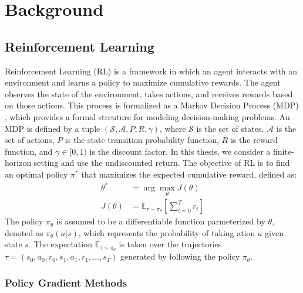 
\chapter{Background}\label{chapter2}

\section{Reinforcement Learning} \label{chap2:sec1}

Reinforcement Learning (RL) is a framework in which an agent interacts with an environment and learns a policy to maximize cumulative rewards.
The agent observes the state of the environment, takes actions, and receives rewards based on those actions.
This process is formalized as a Markov Decision Process (MDP) \cite{MDP}, which provides a formal strcuture for modeling decision-making problems.
An MDP is defined by a tuple \((\mathcal{S}, \mathcal{A}, P, R, \gamma)\), where $\mathcal{S}$ is the set of states, $\mathcal{A}$ is the set of actions, $P$ is the state transition probability function, $R$ is the reward function, and $\gamma \in [0, 1)$ is the discount factor.
In this thesis, we consider a finite-horizon setting and use the undiscounted return.
The objective of RL is to find an optimal policy $\pi^*$ that maximizes the expected cumulative reward, defined as:
\begin{equation}
  \begin{aligned}
    \theta^* &= \arg\max_\theta J(\theta) \\
    J(\theta) &= \mathbb{E}_{\tau \sim \pi_\theta} \left[\sum^T_{t = 0} r_t \right]
  \end{aligned}
\end{equation}
The policy $\pi_\theta$ is assumed to be a differentiable function parmeterized by $\theta$, denoted as $\pi_\theta(a|s)$, which represents the probability of taking ation $a$ given state $s$.
The expectation $\mathbb{E}_{\tau \sim \pi_\theta}$ is taken over the trajectories $\tau = (s_0, a_0, r_0, s_1, a_1, r_1, \ldots, s_T)$ generated by following the policy $\pi_\theta$.


\subsection{Policy Gradient Methods} \label{chap2:sec2}


